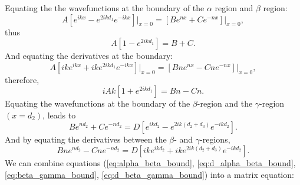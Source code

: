 \documentclass[aps,twocolumn,secnumarabic,nobalancelastpage,amsmath,amssymb,
nofootinbib]{revtex4}
\begin{document}
Equating the the wavefunctions at the boundary of the $\alpha$ region and
$\beta$ region:
%
\begin{equation}
A[e^{ikx} - e^{2ikd_1}e^{-ikx}]\rvert_{x=0} = [Be^{nx} + Ce^{-nx}]\rvert_{x=0},
\end{equation}
thus
\begin{equation}
A[1 - e^{2ikd_1}] = B + C.
\label{eq:alpha_beta_bound}
\end{equation}
%
And equating the derivatives at the boundary:
\begin{equation}
A[ike^{ikx} + ike^{2ikd_1}e^{-ikx}]\rvert_{x=0} =
[Bne^{nx} - Cne^{-nx}]\rvert_{x=0},
\end{equation}
therefore,
\begin{equation}
iAk[1 + e^{2ikd_1}] = Bn - Cn.
\label{eq:d_alpha_beta_bound}
\end{equation}
%
Equating the wavefunctions at the boundary of the $\beta$-region and the
$\gamma$-region $(x=d_2)$, leads to
\begin{equation}
Be^{nd_2} + Ce^{-nd_2} = D[e^{ikd_2} - e^{2ik(d_2+d_3)} e^{-ikd_2}].
\label{eq:beta_gamma_bound}
\end{equation}
%
And by equating the derivatives between the $\beta$- and $\gamma$-regions,
\begin{equation}
Bne^{nd_2} - Cne^{-nd_2} = D[ike^{ikd_2} + ike^{2ik(d_2+d_3)} e^{-ikd_2}].
\label{eq:d_beta_gamma_bound}
\end{equation}
%
We can combine equations (\ref{eq:alpha_beta_bound},
\ref{eq:d_alpha_beta_bound}, \ref{eq:beta_gamma_bound},
\ref{eq:d_beta_gamma_bound}) into a matrix equation:
\end{document}
